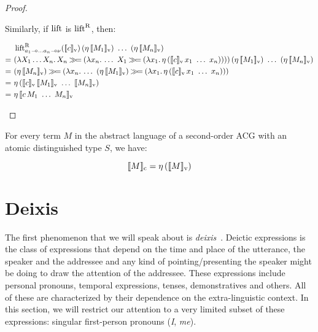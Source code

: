 \begin{proof}
\begin{itemize}
    Similarly, if $\operatorname{lift}$ is $\operatorname{lift}^{\mathrm{R}}$, then:
    
    \begin{align*}
      &\ap{\liftr_{a_1 \limp \ldots a_n \limp \nu}(\sem{c}_\petitv)}
         {(\etaE{\sem{M_1}_\petitv})\ \ldots\ (\etaE{\sem{M_n}_\petitv})} \\
      =\ &\ap{(\lam{X_1 \ldots X_n}{X_n \hsbind (\lam{x_n}{\ldots\ 
                                   X_1 \hsbind (\lam{x_1}{
                   \etaE{(\ap{\sem{c}_\petitv}{x_1\ \ldots\ x_n})}})})})}
            {(\etaE{\sem{M_1}_\petitv})\ \ldots\ (\etaE{\sem{M_n}_\petitv})} \\
      =\ &(\etaE{\sem{M_n}_\petitv}) \hsbind (\lam{x_n}{\ldots\ 
         (\etaE{\sem{M_1}_\petitv}) \hsbind (\lam{x_1}{
              \etaE{(\ap{\sem{c}_\petitv}{x_1\ \ldots\ x_n})}})}) \\
      =\ &\etaE{(\ap{\sem{c}_\petitv}{\sem{M_1}_\petitv\ \ldots\ \sem{M_n}_\petitv})} \\
      =\ &\etaE{\sem{\ap{c}{M_1\ \ldots\ M_n}}_\petitv} \\
    \end{align*}
  \end{itemize}
\end{proof}

\begin{corollary}
  For every term $M$ in the abstract language of a second-order ACG with an
  atomic distinguished type $S$, we have:

  $$
  \llbracket M \rrbracket_{\mathrm{c}} = \eta\,(\llbracket M \rrbracket_{\mathrm{v}})
  $$
\end{corollary}


\section{Deixis}
\label{sec:deixis}

The first phenomenon that we will speak about is
\emph{deixis}~\cite{levinson2004deixis}. Deictic expressions is the class
of expressions that depend on the time and place of the utterance, the
speaker and the addressee and any kind of pointing/presenting the speaker
might be doing to draw the attention of the addressee. These expressions
include personal pronouns, temporal expressions, tenses, demonstratives and
others. All of these are characterized by their dependence on the
extra-linguistic context. In this section, we will restrict our attention
to a very limited subset of these expressions: singular first-person
pronouns (\emph{I}, \emph{me}).

